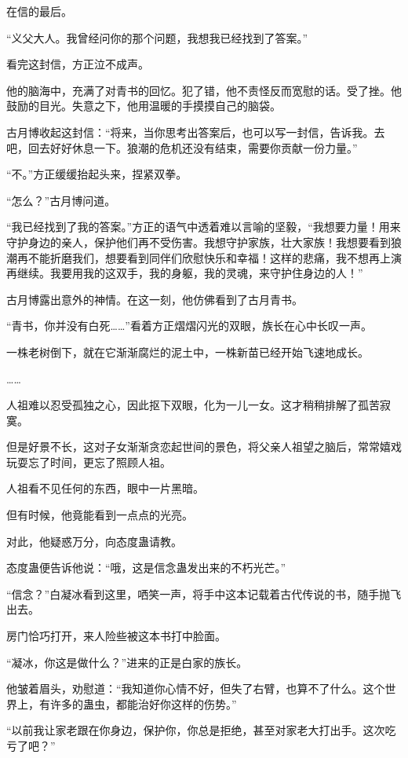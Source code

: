 \begin{this_body}
在信的最后。

“义父大人。我曾经问你的那个问题，我想我已经找到了答案。”

看完这封信，方正泣不成声。

他的脑海中，充满了对青书的回忆。犯了错，他不责怪反而宽慰的话。受了挫。他鼓励的目光。失意之下，他用温暖的手摸摸自己的脑袋。

古月博收起这封信：“将来，当你思考出答案后，也可以写一封信，告诉我。去吧，回去好好休息一下。狼潮的危机还没有结束，需要你贡献一份力量。”

“不。”方正缓缓抬起头来，捏紧双拳。

“怎么？”古月博问道。

“我已经找到了我的答案。”方正的语气中透着难以言喻的坚毅，“我想要力量！用来守护身边的亲人，保护他们再不受伤害。我想守护家族，壮大家族！我想要看到狼潮再不能折磨我们，想要看到同伴们欣慰快乐和幸福！这样的悲痛，我不想再上演再继续。我要用我的这双手，我的身躯，我的灵魂，来守护住身边的人！”

古月博露出意外的神情。在这一刻，他仿佛看到了古月青书。

“青书，你并没有白死……”看着方正熠熠闪光的双眼，族长在心中长叹一声。

一株老树倒下，就在它渐渐腐烂的泥土中，一株新苗已经开始飞速地成长。

……

人祖难以忍受孤独之心，因此抠下双眼，化为一儿一女。这才稍稍排解了孤苦寂寞。

但是好景不长，这对子女渐渐贪恋起世间的景色，将父亲人祖望之脑后，常常嬉戏玩耍忘了时间，更忘了照顾人祖。

人祖看不见任何的东西，眼中一片黑暗。

但有时候，他竟能看到一点点的光亮。

对此，他疑惑万分，向态度蛊请教。

态度蛊便告诉他说：“哦，这是信念蛊发出来的不朽光芒。”

“信念？”白凝冰看到这里，哂笑一声，将手中这本记载着古代传说的书，随手抛飞出去。

房门恰巧打开，来人险些被这本书打中脸面。

“凝冰，你这是做什么？”进来的正是白家的族长。

他皱着眉头，劝慰道：“我知道你心情不好，但失了右臂，也算不了什么。这个世界上，有许多的蛊虫，都能治好你这样的伤势。”

“以前我让家老跟在你身边，保护你，你总是拒绝，甚至对家老大打出手。这次吃亏了吧？”


\end{this_body}
